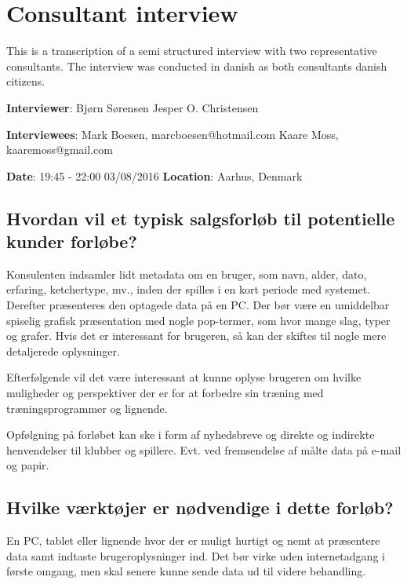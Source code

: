 \chapter{Consultant interview}
This is a transcription of a semi structured interview with two representative consultants.
The interview was conducted in danish as both consultants danish citizens.

\textbf{Interviewer}: \newline
Bjørn Sørensen \newline
Jesper O. Christensen

\textbf{Interviewees}: \newline 
Mark Boesen, marcboesen@hotmail.com \newline
Kaare Moss, kaaremoss@gmail.com

\textbf{Date}: 19:45 - 22:00 03/08/2016 \newline
\textbf{Location}: Aarhus, Denmark

\section*{Hvordan vil et typisk salgsforløb til potentielle kunder forløbe?}
Konsulenten indsamler lidt metadata om en bruger, som navn, alder, dato, erfaring, ketchertype, mv., inden der spilles i en kort periode med systemet. 
Derefter præsenteres den optagede data på en PC. 
Der bør være en umiddelbar spiselig grafisk præsentation med nogle pop-termer, som hvor mange slag, typer og grafer.
Hvis det er interessant for brugeren, så kan der skiftes til nogle mere detaljerede oplysninger.

Efterfølgende vil det være interessant at kunne oplyse brugeren om hvilke muligheder og perspektiver der er for at forbedre sin træning med træningsprogrammer og lignende.

Opfølgning på forløbet kan ske i form af nyhedsbreve og direkte og indirekte henvendelser til klubber og spillere.
Evt. ved fremsendelse af målte data på e-mail og papir.

\section*{Hvilke værktøjer er nødvendige i dette forløb?}
En PC, tablet eller lignende hvor der er muligt hurtigt og nemt at præsentere data samt indtaste brugeroplysninger ind.
Det bør virke uden internetadgang i første omgang, men skal senere kunne sende data ud til videre behandling.

